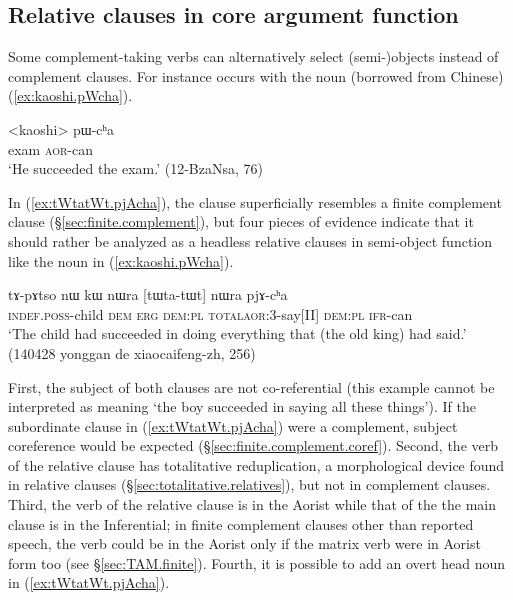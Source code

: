 \subsection{Relative clauses in core argument function}   \label{sec:relative.core.arg}
Some complement-taking verbs can alternatively select (semi-)objects instead of complement clauses. For instance  occurs with the noun  (borrowed from Chinese) (\ref{ex:kaoshi.pWcha}).

\begin{exe}
	\ex \label{ex:kaoshi.pWcha}
	\gll   <kaoshi> pɯ-cʰa  \\
	exam \textsc{aor}-can \\
	\glt `He succeeded the exam.' (12-BzaNsa, 76)
\end{exe}

In (\ref{ex:tWtatWt.pjAcha}), the clause  superficially resembles a finite complement clause (§\ref{sec:finite.complement}), but four pieces of evidence indicate that it should rather be analyzed as a headless relative clauses in semi-object function like the noun  in (\ref{ex:kaoshi.pWcha}).

\begin{exe}
	\ex \label{ex:tWtatWt.pjAcha}
	\gll  tɤ-pɤtso nɯ kɯ nɯra [tɯ\redp{}ta-tɯt] nɯra pjɤ-cʰa \\
	\textsc{indef}.\textsc{poss}-child \textsc{dem} \textsc{erg} \textsc{dem}:\textsc{pl} \textsc{total}\redp{}\textsc{aor}:3\flobv{}-say[II] \textsc{dem}:\textsc{pl} \textsc{ifr}-can \\
	\glt `The child had succeeded in doing everything that (the old king) had said.' (140428 yonggan de xiaocaifeng-zh, 256)
\end{exe}

First, the subject of both clauses are not co-referential (this example cannot be interpreted as meaning `the boy succeeded in saying all these things'). If the subordinate clause in (\ref{ex:tWtatWt.pjAcha}) were a complement, subject coreference would be expected (§\ref{sec:finite.complement.coref}). Second, the verb of the relative clause has totalitative reduplication, a morphological device  found in relative clauses (§\ref{sec:totalitative.relatives}), but not in complement clauses. Third, the verb of the relative clause is in the Aorist while that of the the main clause is in the Inferential; in finite complement clauses other than reported speech, the verb could be in the Aorist only if the matrix verb were in Aorist form too (see §\ref{sec:TAM.finite}). Fourth, it is possible to add an overt head noun in (\ref{ex:tWtatWt.pjAcha}).


